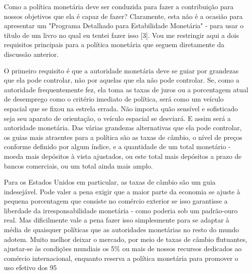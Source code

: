 \documentclass[a4paper,12pt]{article}[abntex2]
\begin{document}
Como a política monetária deve ser conduzida para fazer a contribuição para nossos objetivos que ela é capaz de fazer? Claramente, esta não é a ocasião para apresentar um "Programa Detalhado para Estabilidade Monetária" - para usar o título de um livro no qual eu tentei fazer isso [3]. Vou me restringir aqui a dois requisitos principais para a política monetária que seguem diretamente da discussão anterior.

O primeiro requisito é que a autoridade monetária deve se guiar por grandezas que ela pode controlar, não por aquelas que ela não pode controlar. Se, como a autoridade frequentemente fez, ela toma as taxas de juros ou a porcentagem atual de desemprego como o critério imediato de política, será como um veículo espacial que se fixou na estrela errada. Não importa quão sensível e sofisticado seja seu aparato de orientação, o veículo espacial se desviará. E assim será a autoridade monetária. Das várias grandezas alternativas que ela pode controlar, os guias mais atraentes para a política são as taxas de câmbio, o nível de preços conforme definido por algum índice, e a quantidade de um total monetário - moeda mais depósitos à vista ajustados, ou este total mais depósitos a prazo de bancos comerciais, ou um total ainda mais amplo.

Para os Estados Unidos em particular, as taxas de câmbio são um guia indesejável. Pode valer a pena exigir que a maior parte da economia se ajuste à pequena porcentagem que consiste no comércio exterior se isso garantisse a liberdade da irresponsabilidade monetária - como poderia sob um padrão-ouro real. Mas dificilmente vale a pena fazer isso simplesmente para se adaptar à média de quaisquer políticas que as autoridades monetárias no resto do mundo adotem. Muito melhor deixar o mercado, por meio de taxas de câmbio flutuantes, ajustar-se às condições mundiais os 5\% ou mais de nossos recursos dedicados ao comércio internacional, enquanto reserva a política monetária para promover o uso efetivo dos 95%
\end{document}
